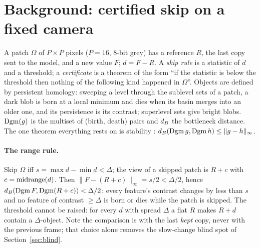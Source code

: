 \section{Background: certified skip on a fixed camera}
\label{sec:background}

A patch $\Omega$ of $P \times P$ pixels ($P = 16$, 8-bit grey) has a reference $R$, the last copy sent to the model, and a new value $F$; $d = F - R$. A \emph{skip rule} is a statistic of $d$ and a threshold; a \emph{certificate} is a theorem of the form ``if the statistic is below the threshold then nothing of the following kind happened in $\Omega$''. Objects are defined by persistent homology: sweeping a level through the sublevel sets of a patch, a dark blob is born at a local minimum and dies when its basin merges into an older one, and its persistence is its contrast; superlevel sets give bright blobs. $\operatorname{Dgm}(g)$ is the multiset of (birth, death) pairs and $d_B$ the bottleneck distance. The one theorem everything rests on is stability \citep{cohensteiner2007}: $d_B(\operatorname{Dgm} g, \operatorname{Dgm} h) \le \lVert g - h \rVert_\infty$.

\paragraph{The range rule.} Skip $\Omega$ iff $s = \max d - \min d < \Delta$; the view of a skipped patch is $R + c$ with $c = \operatorname{midrange}(d)$. Then $\lVert F - (R + c) \rVert_\infty = s/2 < \Delta/2$, hence $d_B(\operatorname{Dgm} F, \operatorname{Dgm}(R + c)) < \Delta/2$: every feature's contrast changes by less than $s$ and no feature of contrast $\ge \Delta$ is born or dies while the patch is skipped. The threshold cannot be raised: for every $d$ with spread $\Delta$ a flat $R$ makes $R + d$ contain a $\Delta$-object. Note the comparison is with the last \emph{kept} copy, never with the previous frame; that choice alone removes the slow-change blind spot of Section~\ref{sec:blind}.

